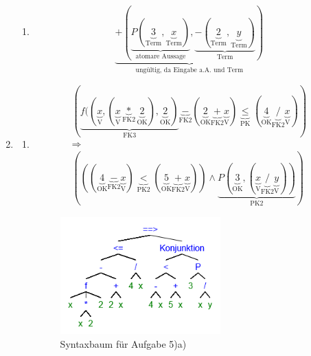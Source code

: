 \documentclass[a4paper]{article}
\begin{document}
\begin{enumerate}
\begin{enumerate}
			\item
			\begin{equation*}
				\underbrace{+(\underbrace{P(\underbrace{3}_{\text{Term}}, \underbrace{x}_{\text{Term}})}_{\text{atomare Aussage}}, \underbrace{-(\underbrace{2}_{\text{Term}}, \underbrace{y}_{\text{Term}})}_{\text{Term}})}_{\text{ungültig, da Eingabe a.A. und Term}}
			\end{equation*}
		\end{enumerate}
		\clearpage
		
		\item
		\begin{enumerate}
			\item
			\begin{equation*}
				\begin{aligned}
					( \underbrace{f((\underbrace{x}_{\text{V}}, ( \underbrace{x}_{\text{V}} \underbrace{*}_{\text{FK2}} \underbrace{2}_{\text{OK}} ), \underbrace{2}_{\text{OK}})}_{\text{FK3}} \underbrace{-}_{\text{FK2}} ( \underbrace{2}_{\text{OK}} \underbrace{+}_{\text{FK2}} \underbrace{x}_{\text{V}})\underbrace{\leq}_{\text{PK}} ( \underbrace{4}_{\text{OK}} \underbrace{/}_{\text{FK2}} \underbrace{x}_{\text{V}} )) \\ \Rightarrow \\ (((\underbrace{4}_{\text{OK}} \underbrace{-}_{\text{FK2}} \underbrace{x}_{\text{V}}) \underbrace{<}_{\text{PK2}} (\underbrace{5}_{\text{OK}} \underbrace{+}_{\text{FK2}} \underbrace{x}_{\text{V}})) \land \underbrace{P(\underbrace{3}_{\text{OK}}, (\underbrace{x}_{\text{V}} \underbrace{/}_{\text{FK2}} \underbrace{y}_{\text{V}}))}_{\text{PK2}})
				\end{aligned}
			\end{equation*}
			\begin{figure}[ht!]
				\begin{center}
					\includegraphics[height=45mm]{5a.png}
					\caption{Syntaxbaum für Aufgabe 5)a)}
				\end{center}
			\end{figure}
		

\end{enumerate}
\end{enumerate}
\end{document}
